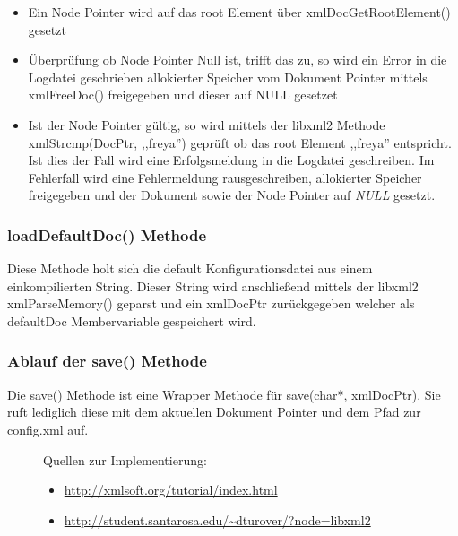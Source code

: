 \begin{itemize}
    \item Ein Node Pointer wird auf das root Element über xmlDocGetRootElement() gesetzt
    \item Überprüfung ob Node Pointer Null ist, trifft das zu, so wird ein Error in die Logdatei geschrieben
        allokierter Speicher vom Dokument Pointer mittels xmlFreeDoc() freigegeben und dieser auf NULL gesetzet
    \item Ist der Node Pointer gültig, so wird mittels der libxml2 Methode xmlStrcmp(DocPtr, ,,freya'') geprüft ob das
        root Element ,,freya'' entspricht. Ist dies der Fall wird eine Erfolgsmeldung in die Logdatei geschreiben. Im Fehlerfall wird eine Fehlermeldung rausgeschreiben, allokierter Speicher freigegeben
        und der Dokument sowie der Node Pointer auf \emph{NULL} gesetzt. 
\end{itemize}


\subsubsection{loadDefaultDoc() Methode}
Diese Methode holt sich die default Konfigurationsdatei aus einem einkompilierten String.
Dieser String wird anschließend mittels der libxml2 xmlParseMemory() geparst und ein xmlDocPtr zurückgegeben welcher als defaultDoc Membervariable gespeichert wird.

\subsubsection{Ablauf der save() Methode}
Die save() Methode ist eine Wrapper Methode für save(char*, xmlDocPtr). Sie ruft lediglich diese mit dem aktuellen Dokument Pointer und dem Pfad zur config.xml auf.

\begin{figure}[htb!]
    Quellen zur Implementierung:
    \begin{itemize}
        \item \url{http://xmlsoft.org/tutorial/index.html}
        \item \url{http://student.santarosa.edu/~dturover/?node=libxml2}
    \end{itemize}
\end{figure}



